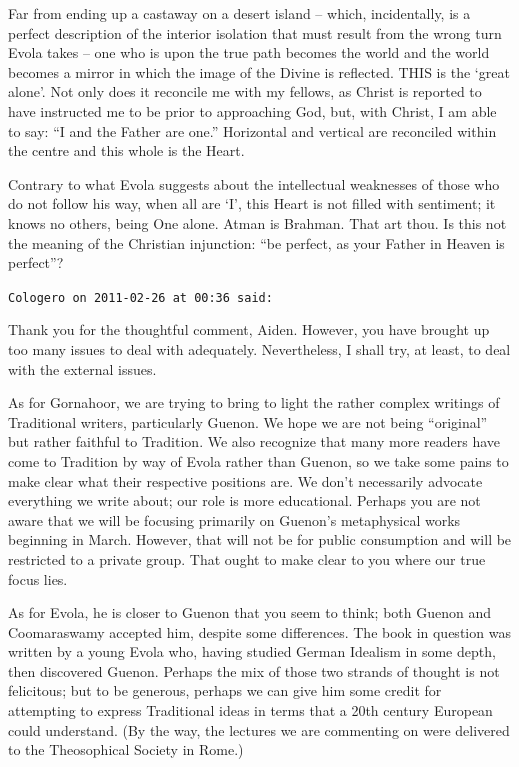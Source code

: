\begin{footnotesize}
\begin{sffamily}
Far from ending up a castaway on a desert island -- which, incidentally, is a perfect description of the interior isolation that must result from the wrong turn Evola takes -- one who is upon the true path becomes the world and the world becomes a mirror in which the image of the Divine is reflected. THIS is the `great alone'. Not only does it reconcile me with my fellows, as Christ is reported to have instructed me to be prior to approaching God, but, with Christ, I am able to say: ``I and the Father are one.'' Horizontal and vertical are reconciled within the centre and this whole is the Heart.

Contrary to what Evola suggests about the intellectual weaknesses of those who do not follow his way, when all are `I', this Heart is not filled with sentiment; it knows no others, being One alone. Atman is Brahman. That art thou. Is this not the meaning of the Christian injunction: ``be perfect, as your Father in Heaven is perfect''?

\hfill

\texttt{Cologero on 2011-02-26 at 00:36 said:}

Thank you for the thoughtful comment, Aiden. However, you have brought up too many issues to deal with adequately. Nevertheless, I shall try, at least, to deal with the external issues.

As for Gornahoor, we are trying to bring to light the rather complex writings of Traditional writers, particularly Guenon. We hope we are not being ``original'' but rather faithful to Tradition. We also recognize that many more readers have come to Tradition by way of Evola rather than Guenon, so we take some pains to make clear what their respective positions are. We don't necessarily advocate everything we write about; our role is more educational. Perhaps you are not aware that we will be focusing primarily on Guenon's metaphysical works beginning in March. However, that will not be for public consumption and will be restricted to a private group. That ought to make clear to you where our true focus lies.

As for Evola, he is closer to Guenon that you seem to think; both Guenon and Coomaraswamy accepted him, despite some differences. The book in question was written by a young Evola who, having studied German Idealism in some depth, then discovered Guenon. Perhaps the mix of those two strands of thought is not felicitous; but to be generous, perhaps we can give him some credit for attempting to express Traditional ideas in terms that a 20th century European could understand. (By the way, the lectures we are commenting on were delivered to the Theosophical Society in Rome.)


\end{sffamily}
\end{footnotesize}
